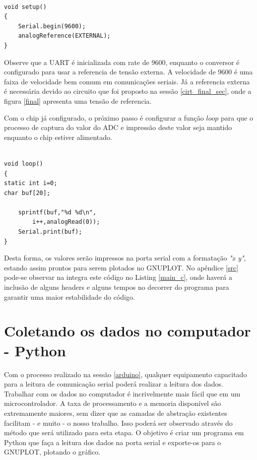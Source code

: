 \begin{multicols}{2}
\begin{lstlisting}[basicstyle=\ttfamily,numbers=none,caption={[setup()]Código da função setup()}]

void setup()
{
	Serial.begin(9600);
	analogReference(EXTERNAL);
}

\end{lstlisting}

Observe que a UART é inicializada com rate de 9600, enquanto o conversor é configurado para usar a referencia de tensão externa. A velocidade de 9600 é uma faixa de velocidade bem comum em comunicações seriais. Já a referencia externa é necessária devido ao circuito que foi proposto na sessão \ref{cirt_final_sec}, onde a figura \ref{final} apresenta uma tensão de referencia.

Com o chip já configurado, o próximo passo é configurar a função $loop$ para que o processo de captura do valor do ADC e impressão deste valor seja mantido enquanto o chip estiver alimentado.



\begin{lstlisting}[basicstyle=\ttfamily,numbers=none,caption={[loop()]Código da função loop()}]

void loop()
{
static int i=0;
char buf[20];

	sprintf(buf,"%d %d\n",
		i++,analogRead(0));
	Serial.print(buf);
}
\end{lstlisting}

Desta forma, os valores serão impressos na porta serial com a formatação \textit{"x y"}, estando assim prontos para serem plotados no GNUPLOT. No apêndice \ref{src} pode-se observar na integra este código no Listing
\ref{main_c}, onde haverá a inclusão de alguns headers e alguns tempos no decorrer do programa para garantir uma maior estabilidade do código.



\section{Coletando os dados no computador - Python}\label{python}

Com o processo realizado na sessão \ref{arduino}, qualquer equipamento capacitado para a leitura de comunicação serial poderá realizar a leitura dos dados. Trabalhar com os dados no computador é incrivelmente mais fácil que em um microcontrolador. A taxa de processamento e a memoria disponível são extremamente maiores, sem dizer que as camadas de abstração existentes facilitam - e muito - o nosso trabalho. Isso poderá ser observado através do método que será utilizado para esta etapa. O objetivo é criar um programa em Python que faça a leitura dos dados na porta serial e exporte-os para o GNUPLOT, plotando o gráfico.


\end{multicols}
